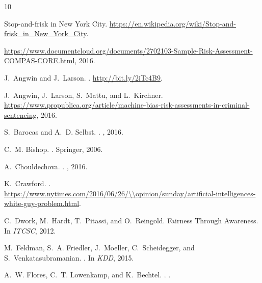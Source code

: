 \documentclass[letterpaper]{sig-alternate-2013}
\begin{document}

\begin{thebibliography}{10}

{Stop-and-frisk in New York City}.
\newblock
  \url{https://en.wikipedia.org/wiki/Stop-and-frisk\_in\_New\_York\_City}.

\url{https://www.documentcloud.org/documents/2702103-Sample-Risk-Assessment-COMPAS-CORE.html},
  2016.

J.~Angwin and J.~Larson.
.
\newblock
  \url{http://bit.ly/2iTc4B9}.

J.~Angwin, J.~Larson, S.~Mattu, and L.~Kirchner.
\newblock
  \url{https://www.propublica.org/article/machine-bias-risk-assessments-in-criminal-sentencing},
  2016.

S.~Barocas and A.~D. Selbst.
.
, 2016.

C.~M. Bishop.
.
\newblock Springer, 2006.

A.~Chouldechova.
.
, 2016.

K.~Crawford.
.
\newblock
  \url{https://www.nytimes.com/2016/06/26/\\opinion/sunday/artificial-intelligences-white-guy-problem.html}.

C.~Dwork, M.~Hardt, T.~Pitassi, and O.~Reingold.
\newblock Fairness {T}hrough {A}wareness.
\newblock In {\em ITCSC}, 2012.

M.~Feldman, S.~A. Friedler, J.~Moeller, C.~Scheidegger, and
  S.~Venkatasubramanian.
.
\newblock In {\em KDD}, 2015.

A.~W. Flores, C.~T. Lowenkamp, and K.~Bechtel.
.
.


\end{thebibliography}
\end{document}

